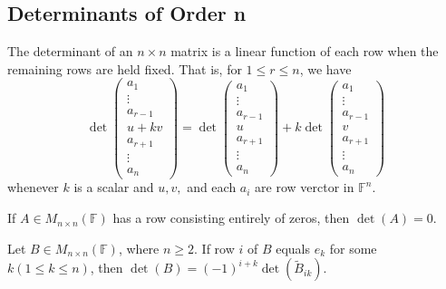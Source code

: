 \subsection{Determinants of Order n}
\begin{theorem}
    The determinant of an \( n \times n \) matrix is a linear function of each row when the remaining rows are held fixed. That is, for \( 1 \leq r \leq n \), we have
    \[
    \det
    \begin{pmatrix}
        a_1 \\
        \vdots \\
        a_{r-1} \\
        u + kv \\
        a_{r+1} \\
        \vdots \\
        a_n
    \end{pmatrix}
    =
    \det
    \begin{pmatrix}
        a_1 \\
        \vdots \\
        a_{r-1} \\
        u \\
        a_{r+1} \\
        \vdots \\
        a_n
    \end{pmatrix}
    + k
    \det
    \begin{pmatrix}
        a_1 \\
        \vdots \\
        a_{r-1} \\
        v \\
        a_{r+1} \\
        \vdots \\
        a_n
    \end{pmatrix}
    \]
    whenever \(k \) is a scalar and \(u, v,\) and each \(a_i\) are row verctor in \(\mathbb{F}^n\).
\end{theorem}
\vspace{10cm}
\begin{corollary}
    If \(A \in M_{n \times n}(\mathbb{F})\) has a row consisting entirely of zeros, then \(\det (A) = 0\).
\end{corollary}
\vspace{3cm}
\begin{lemma}
    Let \(B \in M_{n \times n}(\mathbb{F})\), where \( n \geq 2 \). If row \(i\) of \(B\) equals \(e_k\) for some \(k (1\leq k \leq n)\), then \(\det (B) = (-1)^{i+k} \det (\tilde{B}_{ik})\).
\end{lemma}
